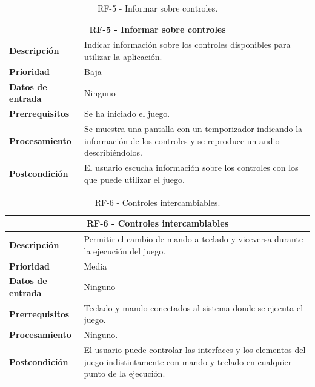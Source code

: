 	\begin{table}[H]
		\centering
		\caption{RF-5 - Informar sobre controles.}
		\label{table:RF5}
		\begin{tabular}{|l|p{10cm}|}
			\hline
			\multicolumn{2}{|c|}{\textbf{RF-5 - Informar sobre controles}} \\
			\hline
			\textbf{Descripción} &  Indicar información sobre los controles disponibles para utilizar la aplicación.  \\
			\hline
			\textbf{Prioridad} & Baja \\
			\hline
			\textbf{Datos de entrada} & Ninguno \\
			\hline
			\textbf{Prerrequisitos} & Se ha iniciado el juego. \\
			\hline
			\textbf{Procesamiento} & Se muestra una pantalla con un temporizador indicando la información de los controles y se reproduce un audio describiéndolos. \\
			\hline
			\textbf{Postcondición} & El usuario escucha información sobre los controles con los que puede utilizar el juego. \\
			\hline
		\end{tabular}
		
	\end{table}
\begin{table}[H]
	\centering
	\caption{RF-6 - Controles intercambiables.}
	\label{table:RF6}
	\begin{tabular}{|l|p{10cm}|}
		\hline
		\multicolumn{2}{|c|}{\textbf{RF-6 - Controles intercambiables}} \\
		\hline
		\textbf{Descripción} & Permitir el cambio de mando a teclado y viceversa durante la ejecución del juego.  \\
		\hline
		\textbf{Prioridad} & Media \\
		\hline
		\textbf{Datos de entrada} & Ninguno \\
		\hline
		\textbf{Prerrequisitos} & Teclado y mando conectados al sistema donde se ejecuta el juego. \\
		\hline
		\textbf{Procesamiento} & Ninguno. \\
		\hline
		\textbf{Postcondición} & El usuario puede controlar las interfaces y los elementos del juego indistintamente con mando y teclado en cualquier punto de la ejecución. \\
		\hline
	\end{tabular}
	
\end{table}
